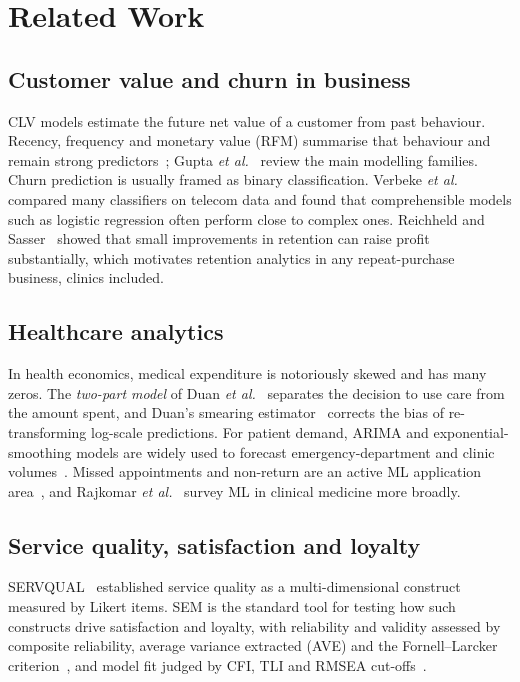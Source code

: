 \documentclass[conference]{IEEEtran}
\begin{document}
\section{Related Work}\label{sec:related}
\subsection{Customer value and churn in business}
CLV models estimate the future net value of a customer from past behaviour. Recency, frequency and monetary value (RFM) summarise that behaviour and remain strong predictors~\cite{fader2005}; Gupta \emph{et al.}~\cite{gupta2006} review the main modelling families. Churn prediction is usually framed as binary classification. Verbeke \emph{et al.}~\cite{verbeke2012} compared many classifiers on telecom data and found that comprehensible models such as logistic regression often perform close to complex ones. Reichheld and Sasser~\cite{reichheld1990} showed that small improvements in retention can raise profit substantially, which motivates retention analytics in any repeat-purchase business, clinics included.

\subsection{Healthcare analytics}
In health economics, medical expenditure is notoriously skewed and has many zeros. The \emph{two-part model} of Duan \emph{et al.}~\cite{duan1983twopart} separates the decision to use care from the amount spent, and Duan's smearing estimator~\cite{duan1983smearing} corrects the bias of re-transforming log-scale predictions. For patient demand, ARIMA and exponential-smoothing models are widely used to forecast emergency-department and clinic volumes~\cite{jones2008}. Missed appointments and non-return are an active ML application area~\cite{dantas2018}, and Rajkomar \emph{et al.}~\cite{rajkomar2019} survey ML in clinical medicine more broadly.

\subsection{Service quality, satisfaction and loyalty}
SERVQUAL~\cite{parasuraman1988} established service quality as a multi-dimensional construct measured by Likert items. SEM is the standard tool for testing how such constructs drive satisfaction and loyalty, with reliability and validity assessed by composite reliability, average variance extracted (AVE) and the Fornell--Larcker criterion~\cite{fornell1981,hair2019}, and model fit judged by CFI, TLI and RMSEA cut-offs~\cite{hu1999}.
\end{document}
